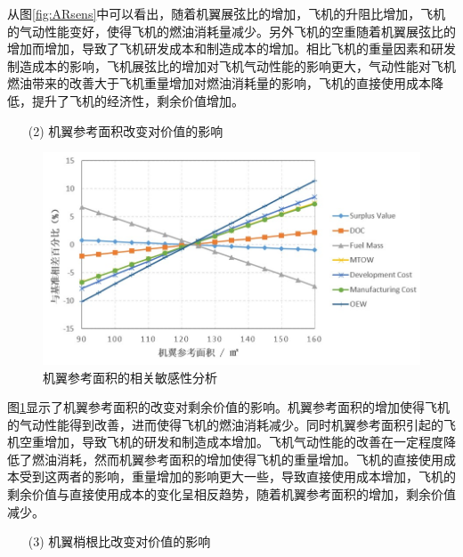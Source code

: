 \documentclass[12pt,a4paper]{report}
\begin{document}
从图\ref{fig:ARsens}中可以看出，随着机翼展弦比的增加，飞机的升阻比增加，飞机的气动性能变好，使得飞机的燃油消耗量减少。另外飞机的空重随着机翼展弦比的增加而增加，导致了飞机研发成本和制造成本的增加。相比飞机的重量因素和研发制造成本的影响，飞机展弦比的增加对飞机气动性能的影响更大，气动性能对飞机燃油带来的改善大于飞机重量增加对燃油消耗量的影响，飞机的直接使用成本降低，提升了飞机的经济性，剩余价值增加。
 \begin{itemize}
    \item[(2)] 机翼参考面积改变对价值的影响
\end{itemize}

 \begin{figure}[!htp]
  \centering
  \includegraphics[width=.9\textwidth]{eps/SVvsWingArea.jpg}
  \caption{机翼参考面积的相关敏感性分析}
 \label{fig:Wingareasens}
\end{figure}
图\ref{fig:Wingareasens}显示了机翼参考面积的改变对剩余价值的影响。机翼参考面积的增加使得飞机的气动性能得到改善，进而使得飞机的燃油消耗减少。同时机翼参考面积引起的飞机空重增加，导致飞机的研发和制造成本增加。飞机气动性能的改善在一定程度降低了燃油消耗，然而机翼参考面积的增加使得飞机的重量增加。飞机的直接使用成本受到这两者的影响，重量增加的影响更大一些，导致直接使用成本增加，飞机的剩余价值与直接使用成本的变化呈相反趋势，随着机翼参考面积的增加，剩余价值减少。
 \begin{itemize}
    \item[(3)] 机翼梢根比改变对价值的影响
\end{itemize}
\end{document}
